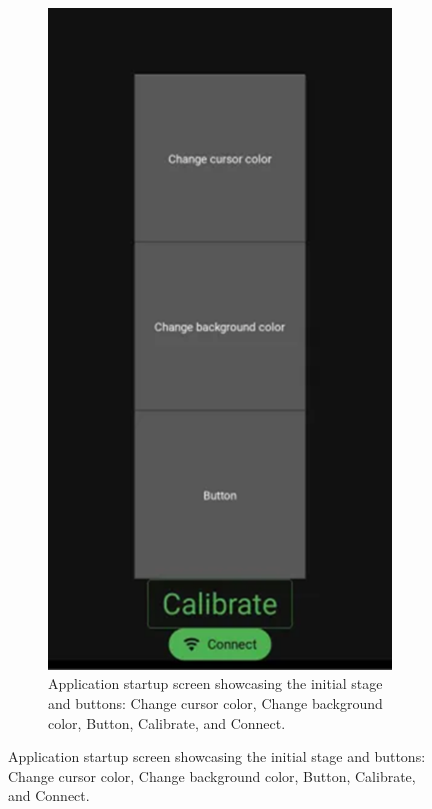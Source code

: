 \documentclass[12pt,a4paper]{article}
\begin{document}
\begin{figure}[htbp]
    \centering
    \begin{subfigure}{0.45\textwidth}
        \centering
        \includegraphics[scale=0.4]{../IoT Materials/article images/8-Screen-showcase-startup.png}
        \vspace{8mm}
        \caption{Application startup screen showcasing the initial stage and buttons: Change cursor color, Change background color, Button, Calibrate, and Connect.}

\end{subfigure}
\end{figure}
\end{document}
